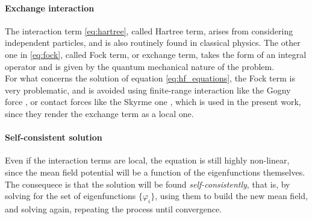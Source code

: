 \paragraph{Exchange interaction}
The interaction term \eqref{eq:hartree}, called Hartree term, arises from considering independent particles, and is also routinely found in classical physics. The other one in \eqref{eq:fock}, called Fock term, or exchange term, takes the form of an integral operator and is given by the quantum mechanical nature of the problem.
\\For what concerns the solution of equation \eqref{eq:hf_equations}, the Fock term is very problematic, and is avoided using finite-range interaction like the Gogny force \cite{Robledo_2019}, or contact forces like the Skyrme one \cite{SKYRME1958615}, which is used in the present work, since they render the exchange term as a local one.
\paragraph{Self-consistent solution}
Even if the interaction terms are local, the equation is still highly non-linear, since the mean field potential will be a function of the eigenfunctions themselves. The consequece is that the solution will be found \textit{self-consistently}, that is, by solving for the set of eigenfunctions $\{\varphi_i\}$, using them to build the new mean field, and solving again, repeating the process until convergence.
